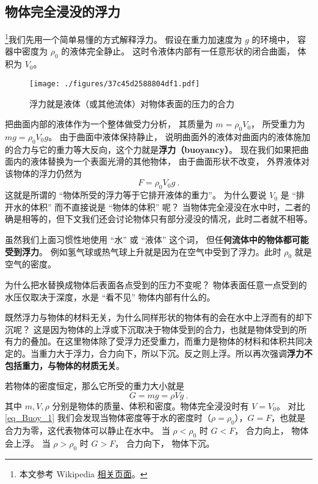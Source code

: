 

\subsection{物体完全浸没的浮力}

\footnote{本文参考 Wikipedia \href{https://en.wikipedia.org/wiki/Archimedes'_principle}{相关页面}。}我们先用一个简单易懂的方式解释浮力。 假设在重力加速度为 $g$ 的环境中， 容器中密度为 $\rho_0$ 的液体完全静止。 这时令液体内部有一任意形状的闭合曲面， 体积为 $V_0$。
\begin{figure}[ht]
\centering
\texttt{[image: ./figures/37c45d2588804df1.pdf]}
\caption{浮力就是液体（或其他流体）对物体表面的压力的合力} \label{fig_Buoy_1}
\end{figure}
把曲面内部的液体作为一个整体做受力分析， 其质量为 $m = \rho_0 V_0$， 所受重力为 $mg = \rho_0 V_0 g$。 由于曲面中液体保持静止， 说明曲面外的液体对曲面内的液体施加的合力与它的重力等大反向，这个力就是\textbf{浮力（buoyancy）}。 现在我们如果把曲面内的液体替换为一个表面光滑的其他物体， 由于曲面形状不改变， 外界液体对该物体的浮力仍然为
\begin{equation}\label{eq_Buoy_1}
F = \rho_0 V_0 g~.
\end{equation}
这就是所谓的 “物体所受的浮力等于它排开液体的重力”。 为什么要说 $V_0$ 是 “排开水的体积” 而不直接说是 “物体的体积” 呢？ 当物体完全浸没在水中时，二者的确是相等的，但下文我们还会讨论物体只有部分浸没的情况，此时二者就不相等。

虽然我们上面习惯性地使用 “水” 或 “液体” 这个词， 但任\textbf{何流体中的物体都可能受到浮力}。 例如氢气球或热气球上升就是因为在空气中受到了浮力。此时 $\rho_0$ 就是空气的密度。

为什么把水替换成物体后表面各点受到的压力不变呢？ 物体表面任意一点受到的水压仅取决于深度，水是 “看不见” 物体内部有什么的。

既然浮力与物体的材料无关，为什么同样形状的物体有的会在水中上浮而有的却下沉呢？ 这是因为物体的上浮或下沉取决于物体受到的合力，也就是物体受到的所有力的叠加。在这里物体除了受浮力还受重力，而重力是物体的材料和体积共同决定的。当重力大于浮力，合力向下，所以下沉。反之则上浮。所以再次强调\textbf{浮力不包括重力，与物体的材质无关}。

若物体的密度恒定，那么它所受的重力大小就是
\begin{equation}
G = mg = \rho V g~.
\end{equation}
其中 $m, V, \rho$ 分别是物体的质量、体积和密度。物体完全浸没时有 $V = V_0$。 对比\autoref{eq_Buoy_1} 我们会发现当物体密度等于水的密度时（$\rho = \rho_0$），$G = F$，也就是合力为零，这代表物体可以静止在水中。 当 $\rho < \rho_0$ 时 $G < F$， 合力向上， 物体会上浮。 当 $\rho > \rho_0$ 时 $G > F$， 合力向下， 物体下沉。

